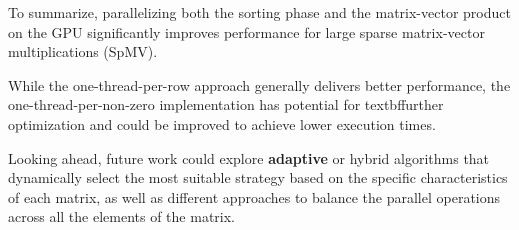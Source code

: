 \documentclass[conference]{IEEEtran}
\begin{document}
    To summarize, parallelizing both the sorting phase and the matrix-vector
    product on the GPU significantly improves performance for large sparse
    matrix-vector multiplications (SpMV).

    While the one-thread-per-row approach generally delivers better performance,
    the one-thread-per-non-zero implementation has potential for 
    textbf{further optimization} and could be improved to achieve lower
    execution times.

    Looking ahead, future work could explore \textbf{adaptive} or hybrid
    algorithms that dynamically select the most suitable strategy based on the
    specific characteristics of each matrix, as well as different approaches to
    balance the parallel operations across all the elements of the matrix.

    
    
\end{document}
